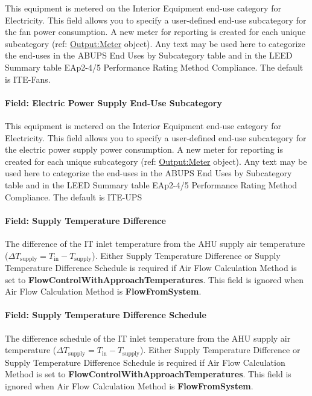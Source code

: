 This equipment is metered on the Interior Equipment end-use category for Electricity. This field allows you to specify a user-defined end-use subcategory for the fan power consumption. A new meter for reporting is created for each unique subcategory (ref: \hyperref[outputmeter-and-outputmetermeterfileonly]{Output:Meter} object). Any text may be used here to categorize the end-uses in the ABUPS End Uses by Subcategory table and in the LEED Summary table EAp2-4/5 Performance Rating Method Compliance. The default is ITE-Fans.

\paragraph{Field: Electric Power Supply End-Use Subcategory}\label{field-electric-power-supply-end-use-subcategory}

This equipment is metered on the Interior Equipment end-use category for Electricity. This field allows you to specify a user-defined end-use subcategory for the electric power supply power consumption. A new meter for reporting is created for each unique subcategory (ref: \hyperref[outputmeter-and-outputmetermeterfileonly]{Output:Meter} object). Any text may be used here to categorize the end-uses in the ABUPS End Uses by Subcategory table and in the LEED Summary table EAp2-4/5 Performance Rating Method Compliance. The default is ITE-UPS

\paragraph{Field: Supply Temperature Difference}\label{field-supply-temperature-difference}

The difference of the IT inlet temperature from the AHU supply air temperature (${\Delta}T_{\textrm{supply}} = T_{\textrm{in}}-T_{\textrm{supply}}$). Either Supply Temperature Difference or Supply Temperature Difference Schedule is required if Air Flow Calculation Method is set to \textbf{FlowControlWithApproachTemperatures}. This field is ignored when Air Flow Calculation Method is \textbf{FlowFromSystem}.

\paragraph{Field: Supply Temperature Difference Schedule}\label{field-supply-temperature-difference-schedule}

The difference schedule of the IT inlet temperature from the AHU supply air temperature (${\Delta}T_{\textrm{supply}} = T_{\textrm{in}}-T_{\textrm{supply}}$). Either Supply Temperature Difference or Supply Temperature Difference Schedule is required if Air Flow Calculation Method is set to \textbf{FlowControlWithApproachTemperatures}. This field is ignored when Air Flow Calculation Method is \textbf{FlowFromSystem}.

